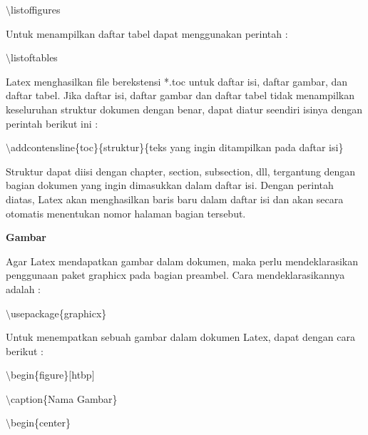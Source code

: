 $\setminus$listoffigures\par \vspace{12pt}

Untuk menampilkan daftar tabel dapat menggunakan perintah :\par \vspace{12pt}

$\setminus$listoftables
\par \vspace{12pt}
Latex menghasilkan file berekstensi *.toc untuk daftar isi, daftar gambar, dan daftar tabel. Jika daftar isi, daftar gambar dan daftar tabel tidak menampilkan keseluruhan struktur dokumen dengan benar, dapat diatur seendiri isinya dengan perintah berikut ini :\par \vspace{12pt}

$\setminus$addcontensline\{toc\}\{struktur\}\{teks yang ingin 
ditampilkan pada daftar isi\}\par \vspace{12pt}

Struktur dapat diisi dengan chapter, section, subsection, dll, 
tergantung dengan bagian dokumen yang ingin dimasukkan dalam daftar isi. Dengan perintah diatas, Latex akan menghasilkan baris baru dalam daftar isi dan akan secara otomatis menentukan nomor halaman bagian tersebut.\par \vspace{12pt}

\textbf{Gambar}\par \vspace{12pt}

Agar Latex mendapatkan gambar dalam dokumen, maka perlu mendeklarasikan penggunaan paket graphicx pada bagian preambel. Cara mendeklarasikannya adalah :\par \vspace{12pt}

$\setminus$usepackage\{graphicx\}\par \vspace{12pt}

Untuk menempatkan sebuah gambar dalam dokumen Latex, dapat dengan cara berikut :

$\setminus$begin\{figure\}$[$htbp$]$
\par \vspace{12pt}
$\setminus$caption\{Nama Gambar\}
\par \vspace{12pt}
$\setminus$begin\{center\}
\par \vspace{12pt}

